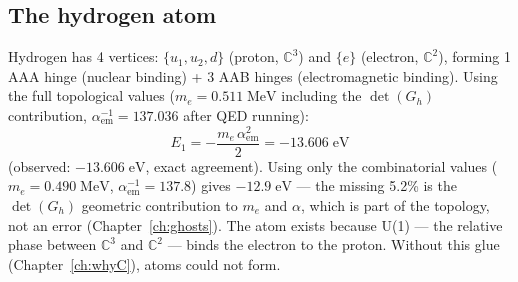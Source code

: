 \subsection{The hydrogen atom}

Hydrogen has 4 vertices: $\{u_1, u_2, d\}$ (proton, $\mathbb{C}^3$) and $\{e\}$ (electron, $\mathbb{C}^2$), forming 1 AAA hinge (nuclear binding) + 3 AAB hinges (electromagnetic binding). Using the full topological values ($m_e = 0.511\;\text{MeV}$ including the $\det(G_h)$ contribution, $\alpha_\text{em}^{-1} = 137.036$ after QED running):
\begin{equation}
E_1 = -\frac{m_e\,\alpha_\text{em}^2}{2} = -13.606\;\text{eV}
\end{equation}
(observed: $-13.606\;\text{eV}$, exact agreement). Using only the combinatorial values ($m_e = 0.490\;\text{MeV}$, $\alpha_\text{em}^{-1} = 137.8$) gives $-12.9\;\text{eV}$ --- the missing 5.2\% is the $\det(G_h)$ geometric contribution to $m_e$ and $\alpha$, which is part of the topology, not an error (Chapter~\ref{ch:ghosts}). The atom exists because U(1) --- the relative phase between $\mathbb{C}^3$ and $\mathbb{C}^2$ --- binds the electron to the proton. Without this glue (Chapter~\ref{ch:whyC}), atoms could not form.
